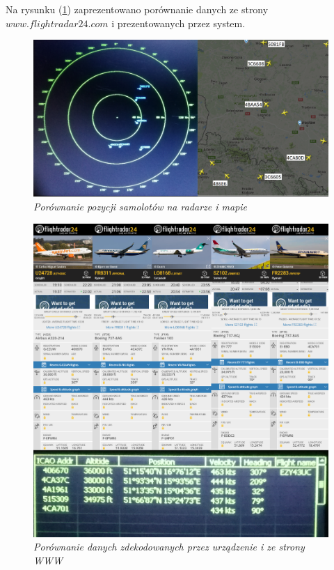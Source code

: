\documentclass[eng,printmode]{mgr}
\begin{document}
Na rysunku (\ref{fig:testMap}) zaprezentowano porównanie danych ze strony $www.flightradar24.com$ i prezentowanych przez system.

\begin{figure}[!h]
    \centering
    \includegraphics[width=\textwidth]{images/radarTest2.png}
    \caption{\textit{Porównanie pozycji samolotów na radarze i mapie}}
    \label{fig:testMap}
\end{figure}
\newpage
\begin{figure}[!h]
    \centering
    \includegraphics[width=14.5cm]{images/dataTest.png}
    \caption{\textit{Porównanie danych zdekodowanych przez urządzenie i ze strony WWW}}
\end{figure}
\end{document}

